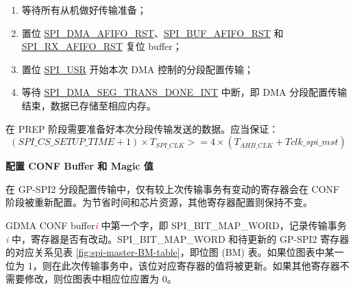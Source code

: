\documentclass[main\_\_CN.tex]{subfiles}
\begin{document}
\begin{enumerate}
   \item 等待所有从机做好传输准备；
   
    \item 置位 \hyperref[fielddesc:SPIDMAAFIFORST]{SPI\_DMA\_AFIFO\_RST}、\hyperref[fielddesc:SPIBUFAFIFORST]{SPI\_BUF\_AFIFO\_RST} 和 \hyperref[fielddesc:SPIRXAFIFORST]{SPI\_RX\_AFIFO\_RST} 复位 buffer；
   
   \item 置位 \hyperref[fielddesc:SPIUSR]{SPI\_USR} 开始本次 DMA 控制的分段配置传输；
   
   \item 等待 \hyperref[int:SPIDMASEGTRANSDONEINT]{SPI\_DMA\_SEG\_TRANS\_DONE\_INT} 中断，即 DMA 分段配置传输结束，数据已存储至相应内存。
 \end{enumerate}

\begin{tiplisting}
\vspace{-2em}
在 PREP 阶段需要准备好本次分段传输发送的数据。应当保证：
\vspace{1em}
    \[
    (\hyperref[fielddesc:SPICSSETUPTIME]{SPI\_CS\_SETUP\_TIME} + 1) \times T_{SPI\_CLK} >= 4 \times (T_{AHB\_CLK} + Tclk\_spi\_mst)
    \]
\end{tiplisting}

\textbf{配置 CONF Buffer 和 Magic 值}\label{sec:sct-conf-buffer}

在 GP-SPI2 分段配置传输中，仅有较上次传输事务有变动的寄存器会在 CONF 阶段被重新配置。为节省时间和芯片资源，其他寄存器配置则保持不变。 

GDMA CONF buffer\textcolor{red}{\it i} 中第一个字，即 SPI\_BIT\_MAP\_WORD，记录传输事务 \textcolor{red}{\it i} 中，寄存器是否有改动。SPI\_BIT\_MAP\_WORD 和待更新的 GP-SPI2 寄存器的对应关系见表  \ref{fig:spi-master-BM-table}，即位图 (BM) 表。如果位图表中某一位为 1，则在此次传输事务中，该位对应寄存器的值将被更新。如果其他寄存器不需要修改，则位图表中相应位应置为 0。
\end{document}

